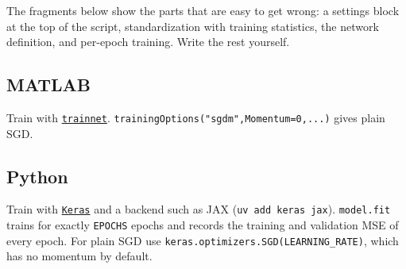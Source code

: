 \documentclass[11pt]{article}
\newcommand{\doc}[2]{\href{#1}{\texttt{#2}}}
\begin{document}
\noindent The fragments below show the parts that are easy to get wrong: a settings block at the top of the script, standardization with training statistics, the network definition, and per-epoch training. Write the rest yourself.

\subsection{MATLAB}
Train with \doc{https://www.mathworks.com/help/deeplearning/ref/trainnet.html}{trainnet}. \texttt{trainingOptions("sgdm",Momentum=0,...)} gives plain SGD.


\bigskip
\subsection{Python}
Train with \doc{https://keras.io/getting_started/}{Keras} and a backend such as JAX (\texttt{uv add keras jax}). \texttt{model.fit} trains for exactly \texttt{EPOCHS} epochs and records the training and validation MSE of every epoch. For plain SGD use \texttt{keras.optimizers.SGD(LEARNING\_RATE)}, which has no momentum by default.

\end{document}
